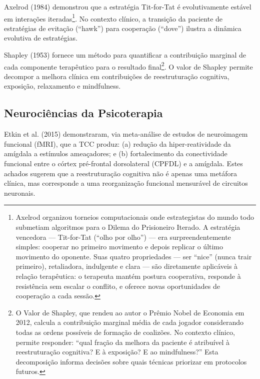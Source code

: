 \documentclass[12pt,a4paper]{article}
\begin{document}
Axelrod (1984) demonstrou que a estratégia Tit-for-Tat é evolutivamente estável em interações iteradas\footnote{Axelrod organizou torneios computacionais onde estrategistas do mundo todo submetiam algoritmos para o Dilema do Prisioneiro Iterado. A estratégia vencedora --- Tit-for-Tat (``olho por olho'') --- era surpreendentemente simples: cooperar no primeiro movimento e depois replicar o último movimento do oponente. Suas quatro propriedades --- ser ``nice'' (nunca trair primeiro), retaliadora, indulgente e clara --- são diretamente aplicáveis à relação terapêutica: o terapeuta mantém postura cooperativa, responde à resistência sem escalar o conflito, e oferece novas oportunidades de cooperação a cada sessão.}. No contexto clínico, a transição da paciente de estratégias de evitação (``hawk'') para cooperação (``dove'') ilustra a dinâmica evolutiva de estratégias.

Shapley (1953) fornece um método para quantificar a contribuição marginal de cada componente terapêutico para o resultado final\footnote{O Valor de Shapley, que rendeu ao autor o Prêmio Nobel de Economia em 2012, calcula a contribuição marginal média de cada jogador considerando todas as ordens possíveis de formação de coalizões. No contexto clínico, permite responder: ``qual fração da melhora da paciente é atribuível à reestruturação cognitiva? E à exposição? E ao mindfulness?'' Esta decomposição informa decisões sobre quais técnicas priorizar em protocolos futuros.}. O valor de Shapley permite decompor a melhora clínica em contribuições de reestruturação cognitiva, exposição, relaxamento e mindfulness.

\subsection{Neurociências da Psicoterapia}

Etkin et al. (2015) demonstraram, via meta-análise de estudos de neuroimagem funcional (fMRI), que a TCC produz: (a) redução da hiper-reatividade da amígdala a estímulos ameaçadores; e (b) fortalecimento da conectividade funcional entre o córtex pré-frontal dorsolateral (CPFDL) e a amígdala. Estes achados sugerem que a reestruturação cognitiva não é apenas uma metáfora clínica, mas corresponde a uma reorganização funcional mensurável de circuitos neuronais.
\end{document}
